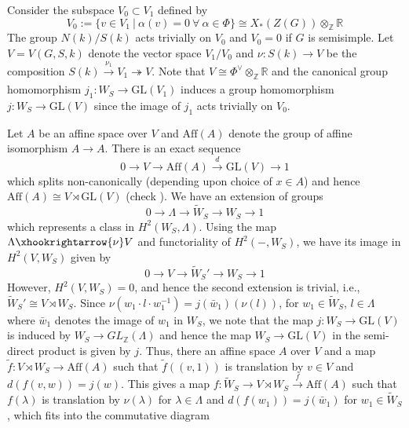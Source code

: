 \documentclass[11 pt]{article}
\numberwithin{equation}{subsection}
\theoremstyle{definition}
\theoremstyle{remark}
\theoremstyle{conjecture}
\newcommand{\GL}{\mathrm{GL}}
\newcommand{\Z}{\mathbb Z}
\newcommand{\R}{\mathbb R}
\newcommand{\blue}{\textcolor{blue}}
\begin{document}
Consider the subspace $V_0\subset V_1$ defined by 
\begin{equation*}
    V_0:=\{v \in V_1\:|\: \alpha(v)=0 \:\forall\: \alpha \in \Phi \} \cong X_*(Z(G))\otimes_\Z \R
\end{equation*}
The group $N(k)/S(k)$ acts trivially on $V_0$ and $V_0=0$ if $G$ is semisimple. Let $V= V(G,S,k)$ denote the vector space $V_1/V_0$ and $\nu:S(k)\rightarrow V$ be the composition $S(k) \xrightarrow[]{\nu_1} V_1\twoheadrightarrow V$. Note that $V \cong \Phi^\vee\otimes_\Z \R$ and the canonical group homomorphism $j_1: W_S \rightarrow \GL(V_1)$ induces a group homomorphism $j: W_S\rightarrow \GL(V)$ since the image of $j_1$ acts trivially on $V_0$. \par
Let $A$ be an affine space over $V$ and $\mathrm{Aff}(A)$ denote the group of affine isomorphism $A\rightarrow A$. There is an exact sequence
\begin{equation*}
    0\rightarrow V\rightarrow \mathrm{Aff}(A)\xrightarrow{d}\GL(V)\rightarrow 1 
\end{equation*}
which splits non-canonically (depending upon choice of $x \in A$) and hence $\mathrm{Aff}(A) \cong V \rtimes \GL(V)$ (check \cite[Section 1.2]{KP23}). We have an extension of groups 
\begin{equation*}
    0 \rightarrow \Lambda \rightarrow \widetilde W_S \rightarrow W_S \rightarrow 1
\end{equation*}
which represents a class in $H^2(W_S,\Lambda)$. Using the map $\Lambda \xhookrightarrow{\nu} V$ and functoriality of $H^2(-,W_S)$, we have its image in $H^2(V, W_S)$ given by 
\begin{equation*}
    0 \rightarrow V\rightarrow \widetilde W_S' \rightarrow W_S \rightarrow 1
\end{equation*}
However, $H^2(V, W_S)=0$, and hence the second extension is trivial, i.e., $\widetilde W_S' \cong V \rtimes W_S$. 
Since $\nu(w_1\cdot  l\cdot w_1^{-1})= j(\bar w_1)(\nu(l))$, for $w_1 \in \widetilde W_S$, $l \in \Lambda$ where $\bar w_1$ denotes the image of $w_1$ in $W_S$, we note that the map $j: W_S \rightarrow \GL(V)$ is induced by $W_S \rightarrow GL_{\Z}(\Lambda)$ and hence the map $W_S \rightarrow \GL(V)$ in the semi-direct product is given by $j$. Thus, there an affine space $A$ over $V$ and a map $\tilde f: V \rtimes W_S \rightarrow \mathrm{Aff}(A)$ such that $\tilde f((v,1))$ is translation by $v \in V$ and $d(f(v,w))= j (w)$. This gives a map $f: \widetilde W_S \rightarrow V \rtimes W_S \xrightarrow{f}\mathrm{Aff}(A)$ such that $f(\lambda)$ is translation by $\nu(\lambda)$ for $\lambda \in \Lambda$ and $d(f(w_1))= j(\bar w_1)$ for $w_1 \in \widetilde W_S$, which fits into the commutative diagram 
\end{document}
